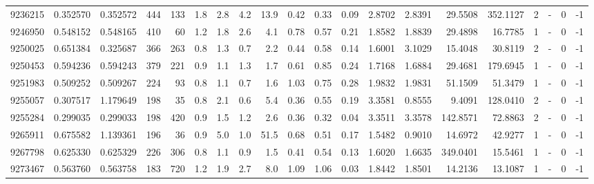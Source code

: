 \begin{tabular}{rrrrrrrrrrrrrrrrrlrl}
   9236215 & 0.352570 &   0.352572 &  444 &  133 &      1.8 &      2.8 &     4.2 &     13.9 &       0.42 &        0.33 &        0.09 &  2.8702 &  2.8391 &   29.5508 &  352.1127 &       2 &             - &        0 &        -1 \\
   9246950 & 0.548152 &   0.548165 &  410 &   60 &      1.2 &      1.8 &     2.6 &      4.1 &       0.78 &        0.57 &        0.21 &  1.8582 &  1.8839 &   29.4898 &   16.7785 &       1 &             - &        0 &        -1 \\
   9250025 & 0.651384 &   0.325687 &  366 &  263 &      0.8 &      1.3 &     0.7 &      2.2 &       0.44 &        0.58 &        0.14 &  1.6001 &  3.1029 &   15.4048 &   30.8119 &       2 &             - &        0 &        -1 \\
   9250453 & 0.594236 &   0.594243 &  379 &  221 &      0.9 &      1.1 &     1.3 &      1.7 &       0.61 &        0.85 &        0.24 &  1.7168 &  1.6884 &   29.4681 &  179.6945 &       1 &             - &        0 &        -1 \\
   9251983 & 0.509252 &   0.509267 &  224 &   93 &      0.8 &      1.1 &     0.7 &      1.6 &       1.03 &        0.75 &        0.28 &  1.9832 &  1.9831 &   51.1509 &   51.3479 &       1 &             - &        0 &        -1 \\
   9255057 & 0.307517 &   1.179649 &  198 &   35 &      0.8 &      2.1 &     0.6 &      5.4 &       0.36 &        0.55 &        0.19 &  3.3581 &  0.8555 &    9.4091 &  128.0410 &       2 &             - &        0 &        -1 \\
   9255284 & 0.299035 &   0.299033 &  198 &  420 &      0.9 &      1.5 &     1.2 &      2.6 &       0.36 &        0.32 &        0.04 &  3.3511 &  3.3578 &  142.8571 &   72.8863 &       2 &             - &        0 &        -1 \\
   9265911 & 0.675582 &   1.139361 &  196 &   36 &      0.9 &      5.0 &     1.0 &     51.5 &       0.68 &        0.51 &        0.17 &  1.5482 &  0.9010 &   14.6972 &   42.9277 &       1 &             - &        0 &        -1 \\
   9267798 & 0.625330 &   0.625329 &  226 &  306 &      0.8 &      1.1 &     0.9 &      1.5 &       0.41 &        0.54 &        0.13 &  1.6020 &  1.6635 &  349.0401 &   15.5461 &       1 &             - &        0 &        -1 \\
   9273467 & 0.563760 &   0.563758 &  183 &  720 &      1.2 &      1.9 &     2.7 &      8.0 &       1.09 &        1.06 &        0.03 &  1.8442 &  1.8501 &   14.2136 &   13.1087 &       1 &             - &        0 &        -1 \\

\end{tabular}
